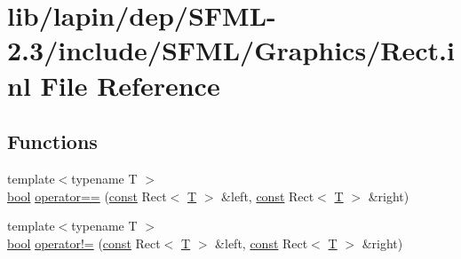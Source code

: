 \hypertarget{lapin_2dep_2_s_f_m_l-2_83_2include_2_s_f_m_l_2_graphics_2_rect_8inl}{\section{lib/lapin/dep/\-S\-F\-M\-L-\/2.3/include/\-S\-F\-M\-L/\-Graphics/\-Rect.inl File Reference}
\label{lapin_2dep_2_s_f_m_l-2_83_2include_2_s_f_m_l_2_graphics_2_rect_8inl}
}
\subsection*{Functions}
\begin{DoxyCompactItemize}
\item 
{\footnotesize template$<$typename T $>$ }\\\hyperlink{term__entry_8h_a002004ba5d663f149f6c38064926abac}{bool} \hyperlink{lapin_2dep_2_s_f_m_l-2_83_2include_2_s_f_m_l_2_graphics_2_rect_8inl_ab3488b5dbd0e587c4d7cb80605affc46}{operator==} (\hyperlink{term__entry_8h_a57bd63ce7f9a353488880e3de6692d5a}{const} Rect$<$ \hyperlink{curses_8priv_8h_a5ef253115820acf7d27f3c5c3b02a0f0}{T} $>$ \&left, \hyperlink{term__entry_8h_a57bd63ce7f9a353488880e3de6692d5a}{const} Rect$<$ \hyperlink{curses_8priv_8h_a5ef253115820acf7d27f3c5c3b02a0f0}{T} $>$ \&right)
\item 
{\footnotesize template$<$typename T $>$ }\\\hyperlink{term__entry_8h_a002004ba5d663f149f6c38064926abac}{bool} \hyperlink{lapin_2dep_2_s_f_m_l-2_83_2include_2_s_f_m_l_2_graphics_2_rect_8inl_a03fc4c105687b7d0f07b6b4ed4b45581}{operator!=} (\hyperlink{term__entry_8h_a57bd63ce7f9a353488880e3de6692d5a}{const} Rect$<$ \hyperlink{curses_8priv_8h_a5ef253115820acf7d27f3c5c3b02a0f0}{T} $>$ \&left, \hyperlink{term__entry_8h_a57bd63ce7f9a353488880e3de6692d5a}{const} Rect$<$ \hyperlink{curses_8priv_8h_a5ef253115820acf7d27f3c5c3b02a0f0}{T} $>$ \&right)
\end{DoxyCompactItemize}


